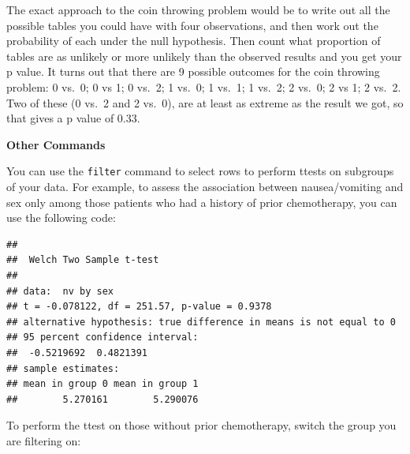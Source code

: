\documentclass[]{book}
\newenvironment{Shaded}{\begin{snugshade}}{\end{snugshade}}
\newcommand{\DataTypeTok}[1]{\textcolor[rgb]{0.13,0.29,0.53}{#1}}
\newcommand{\DecValTok}[1]{\textcolor[rgb]{0.00,0.00,0.81}{#1}}
\newcommand{\KeywordTok}[1]{\textcolor[rgb]{0.13,0.29,0.53}{\textbf{#1}}}
\newcommand{\NormalTok}[1]{#1}
\newcommand{\OperatorTok}[1]{\textcolor[rgb]{0.81,0.36,0.00}{\textbf{#1}}}
\newcommand{\StringTok}[1]{\textcolor[rgb]{0.31,0.60,0.02}{#1}}
\begin{document}
The exact approach to the coin throwing problem would be to write out all the possible tables you could have with four observations, and then work out the probability of each under the null hypothesis. Then count what proportion of tables are as unlikely or more unlikely than the observed results and you get your p value. It turns out that there are 9 possible outcomes for the coin throwing problem: 0 vs.~0; 0 vs 1; 0 vs.~2; 1 vs.~0; 1 vs.~1; 1 vs.~2; 2 vs.~0; 2 vs 1; 2 vs.~2. Two of these (0 vs.~2 and 2 vs.~0), are at least as extreme as the result we got, so that gives a p value of 0.33.

\textbf{Other Commands}

You can use the \texttt{filter} command to select rows to perform ttests on subgroups of your data. For example, to assess the association between nausea/vomiting and sex only among those patients who had a history of prior chemotherapy, you can use the following code:

\begin{Shaded}
\end{Shaded}

\begin{verbatim}
## 
##  Welch Two Sample t-test
## 
## data:  nv by sex
## t = -0.078122, df = 251.57, p-value = 0.9378
## alternative hypothesis: true difference in means is not equal to 0
## 95 percent confidence interval:
##  -0.5219692  0.4821391
## sample estimates:
## mean in group 0 mean in group 1 
##        5.270161        5.290076
\end{verbatim}

To perform the ttest on those without prior chemotherapy, switch the group you are filtering on:

\begin{Shaded}
\end{Shaded}
\end{document}
